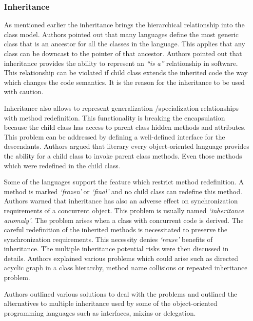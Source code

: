 \documentclass[12pt,twoside,a4paper]{report}
\begin{document}
\subsubsection{Inheritance}
As mentioned earlier the inheritance brings the hierarchical relationship into the class model. Authors pointed out that many languages define the most generic class that is an ancestor for all the classes in the language. This applies that any class can be downcast to the pointer of that ancestor. Authors pointed out that inheritance provides the ability to represent an \textit{“is a”} relationship in software. This relationship can be violated if child class extends the inherited code the way which changes the code semantics. It is the reason for the inheritance to be used with caution.\par
Inheritance also allows to represent generalization /specialization relationships with method redefinition. This functionality is breaking the encapsulation because the child class has access to parent class hidden methods and attributes. This problem can be addressed by defining a well-defined interface for the descendants. Authors argued that literary every object-oriented language provides the ability for a child class to invoke parent class methods. Even those methods which were redefined in the child class.\par
Some of the languages support the feature which restrict method redefinition. A method is marked \textit{‘frozen’} or \textit{‘final’} and no child class can redefine this method. Authors warned that inheritance has also an adverse effect on synchronization requirements of a concurrent object. This problem is usually named \textit{‘inheritance anomaly’}. The problem arises when a class with concurrent code is derived. The careful redefinition of the inherited methods is necessitated to preserve the synchronization requirements. This necessity denies \textit{‘reuse’} benefits of inheritance. The multiple inheritance potential risks were then discussed in details. Authors explained various problems which could arise such as directed acyclic graph in a class hierarchy, method name collisions or repeated inheritance problem.\par
Authors outlined various solutions to deal with the problems and outlined the alternatives to multiple inheritance used by some of the object-oriented programming languages such as interfaces, mixins or delegation.
\end{document}
